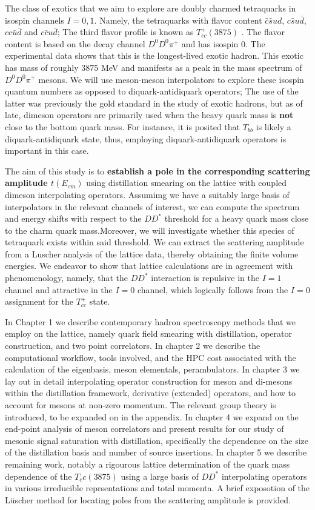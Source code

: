 The class of exotics that we aim to explore are doubly charmed tetraquarks in isospin channels $I=0,1$. Namely, the tetraquarks with flavor content $\bar c\bar s ud$, $c\bar s u\bar d$, $cc\bar u\bar d$ and $c\bar c u\bar d$; The third flavor profile is known as $T_{cc}^+(3875)$ \cite{LHCb:2021vvq}. The flavor content is based on the decay channel $D^0D^0\pi^+$ and has isospin 0. The experimental data shows that this is the longest-lived exotic hadron. This exotic has mass of roughly 3875 MeV and manifests as a peak in the mass spectrum of $D^0D^0\pi^+$ mesons.  We will use meson-meson interpolators to explore these isospin quantum numbers as opposed to diquark-antidiquark operators; The use of the latter was previously the gold standard in the study of exotic hadrons, but as of late, dimeson operators are primarily used when the heavy quark mass is \textbf{not} close to the bottom quark mass. For instance, it is posited that $T_{bb}$ is likely a diquark-antidiquark state, thus, employing diquark-antidiquark operators is important in this case.  

The aim of this study is to \textbf{establish a pole in the corresponding scattering amplitude $t(E_{cm})$} using distillation smearing on the lattice with coupled dimeson interpolating operators. Assumimg we have a suitably large basis of interpolators in the relevant channels of interest, we can compute the spectrum and energy shifts with respect to the $DD^*$ threshold for a heavy quark mass close to the charm quark mass.Moreover, we will investigate whether this species of tetraquark exists within said threshold. We can extract the scattering amplitude from a Luscher analysis of the lattice data, thereby obtaining the finite volume energies. We endeavor to show that lattice calculations are in agreement with phenomenology, namely, that the $DD^*$ interaction is repulsive in the $I=1$ channel and attractive in the $I=0$ channel, which logically follows from the $I=0$ assignment for the $T_{cc}^+$ state. 


In Chapter 1 we describe contemporary hadron spectroscopy methods that we employ on the lattice,  namely quark field smearing with distillation, operator construction, and two point correlators. In chapter 2 we describe the computational workflow, tools involved, and the HPC cost associated with the calculation of the eigenbasis, meson elementals, perambulators. In chapter 3 we lay out in detail interpolating operator construction for meson and di-mesons within the distillation framework, derivative (extended) operators, and how to account for mesons at non-zero momentum. The relevant group theory is introduced, to be expanded on in the appendix. In chapter 4 we expand on the end-point analysis of meson correlators and present results for our study of mesonic signal saturation with distillation, specifically the dependence on the size of the distillation basis and number of source insertions. In chapter 5 we describe remaining work, notably a rigourous lattice determination of the quark mass dependence of the $T_cc(3875)$ using a large basis of $DD^*$ interpolating operators in various irreducible reprsentations and total momenta. A brief exposotion of the L\"{u}scher method for locating poles from the scattering amplitude is provided. 